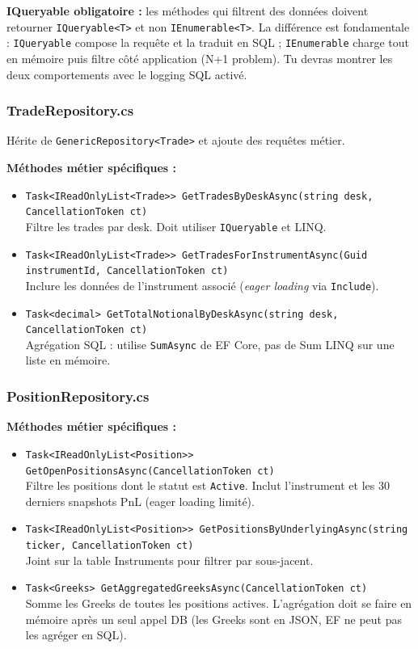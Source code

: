 \documentclass[a4paper,11pt]{article}
\newcommand{\cs}[1]{\texttt{\color{codeinline}#1}}
\begin{document}
\begin{tcolorbox}[constraint]
\textbf{IQueryable obligatoire :} les méthodes qui filtrent des données doivent
retourner \cs{IQueryable<T>} et non \cs{IEnumerable<T>}. La différence est
fondamentale : \cs{IQueryable} compose la requête et la traduit en SQL ;
\cs{IEnumerable} charge tout en mémoire puis filtre côté application (N+1
problem). Tu devras montrer les deux comportements avec le logging SQL activé.
\end{tcolorbox}

\subsubsection{TradeRepository.cs}

Hérite de \cs{GenericRepository<Trade>} et ajoute des requêtes métier.

\textbf{Méthodes métier spécifiques :}
\begin{itemize}
  \item \cs{Task<IReadOnlyList<Trade>> GetTradesByDeskAsync(string desk, CancellationToken ct)}\\
        Filtre les trades par desk. Doit utiliser \cs{IQueryable} et LINQ.
  \item \cs{Task<IReadOnlyList<Trade>> GetTradesForInstrumentAsync(Guid instrumentId, CancellationToken ct)}\\
        Inclure les données de l'instrument associé (\emph{eager loading} via
        \cs{Include}).
  \item \cs{Task<decimal> GetTotalNotionalByDeskAsync(string desk, CancellationToken ct)}\\
        Agrégation SQL : utilise \cs{SumAsync} de EF Core, pas de Sum LINQ
        sur une liste en mémoire.
\end{itemize}

\subsubsection{PositionRepository.cs}

\textbf{Méthodes métier spécifiques :}
\begin{itemize}
  \item \cs{Task<IReadOnlyList<Position>> GetOpenPositionsAsync(CancellationToken ct)}\\
        Filtre les positions dont le statut est \cs{Active}. Inclut l'instrument
        et les 30 derniers snapshots PnL (eager loading limité).
  \item \cs{Task<IReadOnlyList<Position>> GetPositionsByUnderlyingAsync(string ticker, CancellationToken ct)}\\
        Joint sur la table Instruments pour filtrer par sous-jacent.
  \item \cs{Task<Greeks> GetAggregatedGreeksAsync(CancellationToken ct)}\\
        Somme les Greeks de toutes les positions actives. L'agrégation doit se
        faire en mémoire après un seul appel DB (les Greeks sont en JSON, EF ne
        peut pas les agréger en SQL).
\end{itemize}
\end{document}
